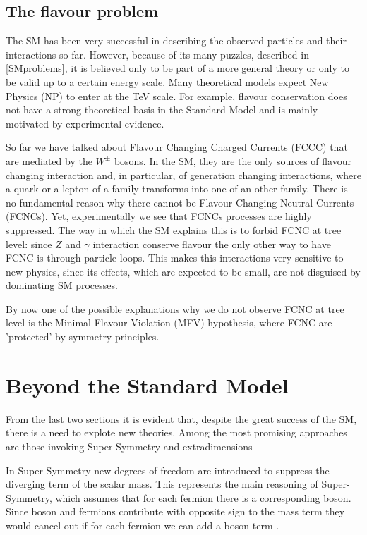\subsection{The flavour problem}

The SM has been very successful in describing the observed particles and their interactions so far. However, because
of its many puzzles, described in \ref{SMproblems}, it is believed only to be part of a more general theory or only
to be valid up to a certain energy scale. Many theoretical models expect New Physics (NP) to enter at the TeV scale.
For example, flavour conservation does not have a strong theoretical basis in the Standard Model and is mainly motivated
by experimental evidence.

So far we have talked about Flavour Changing Charged Currents (FCCC) that are mediated by the $W^\pm$ bosons. In the SM,
they are the only sources of flavour changing interaction and, in particular, of generation changing interactions,
where a quark or a lepton of a family transforms into one of an other family. There is no fundamental reason why there
cannot be Flavour Changing Neutral Currents (FCNCs). Yet, experimentally we see that FCNCs processes are highly suppressed.
The way in which the SM explains this is to forbid FCNC at tree level: since $Z$ and $\gamma$ interaction conserve flavour
the only other way to have FCNC is through particle loops. This makes this interactions very sensitive to new physics,
since its effects, which are expected to be small, are not disguised by dominating SM processes.

By now one of the possible explanations why we do not observe FCNC at tree level is the Minimal Flavour Violation (MFV)
hypothesis\cite{Isidori:2012ts}\cite{Buras:2003jf}, where FCNC are 'protected' by symmetry principles.


\section{Beyond the Standard Model}

From the last two sections it is evident that, despite the great success of the SM,
there is a need to explote new theories. Among the most promising approaches are those
invoking Super-Symmetry and extradimensions 

In Super-Symmetry new degrees of freedom are introduced to suppress the diverging term of the scalar mass. This represents
the main reasoning of Super-Symmetry, which assumes that for each fermion there is a corresponding boson. Since boson and
fermions contribute with opposite sign to the mass term they would cancel out if for each fermion we can add a boson term
\cite{Fayet:1976cr}.

